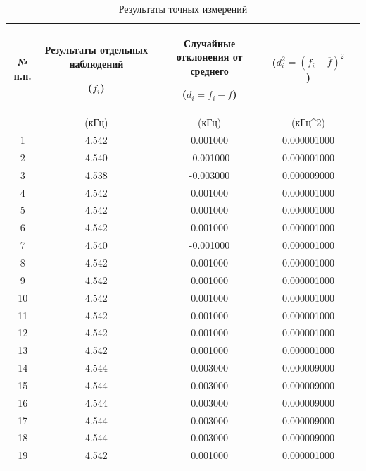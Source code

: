 \begin{center}
\begin{table}[h!]
\centering
\caption{Результаты точных измерений}
\label{tabl:2}
\begin{tabular}{|c|c|c|c|c|}
\hline
\begin{minipage}{7mm}
    № п.п. 
\end{minipage}&
\begin{minipage}{5cm}
\begin{center}
    Результаты отдельных наблюдений 
    
    ($f_i$)
\end{center}
\end{minipage} &
\begin{minipage}{5cm}
\begin{center}
    Случайные отклонения от среднего
    
    ($d_i = f_i - \overline{f}$)
\end{center}
\end{minipage} &
\begin{minipage}{5cm}
\begin{center}
    ($d_i^2 = (f_i - \overline{f})^2$)
\end{center}
\end{minipage}\\
\hline
{}&(кГц)&(кГц)&(кГц^2)\\
\hline
1  &    4.542  &   0.001000  &  0.000001000 \\
2  &    4.540  &  -0.001000  &  0.000001000 \\
3  &	4.538  &  -0.003000  &  0.000009000 \\
4  &	4.542  &   0.001000  &  0.000001000 \\
5  &	4.542  &   0.001000  &  0.000001000 \\
6  &	4.542  &   0.001000  &  0.000001000 \\
7  &	4.540  &  -0.001000  &  0.000001000 \\
8  &	4.542  &   0.001000  &  0.000001000 \\
9  &    4.542  &   0.001000  &  0.000001000 \\
10 &	4.542  &   0.001000  &  0.000001000 \\
11 &	4.542  &   0.001000  &  0.000001000 \\
12 &	4.542  &   0.001000  &  0.000001000 \\
13 &	4.542  &   0.001000  &  0.000001000 \\
14 &	4.544  &   0.003000  &  0.000009000 \\
15 &	4.544  &   0.003000  &  0.000009000 \\
16 &	4.544  &   0.003000  &  0.000009000 \\
17 &	4.544  &   0.003000  &  0.000009000 \\
18 &	4.544  &   0.003000  &  0.000009000 \\
19 &	4.542  &   0.001000  &  0.000001000 \\
\hline
\end{tabular}
\end{table}
\end{center}

